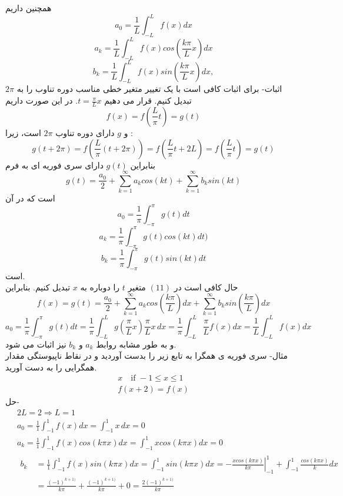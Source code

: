 همچنین داریم
\[
a_0=\frac{1}{L}\int_{-L}^L{f(x)dx}
\]
\[
a_k=\frac{1}{L}\int_{-L}^L{f(x)cos\left(\frac{k\pi}{L}x\right)dx}
\]
\[
b_k=\frac{1}{L}\int_{-L}^L{f(x)sin\left(\frac{k\pi}{L}x\right)dx},
\]
اثبات- برای اثبات کافی است با یک تغییر متغیر خطی مناسب دوره تناوب را به
$2\pi$
تبدیل کنیم. قرار می دهیم
$t=\frac{\pi}{L}x$.
در این صورت داریم
\[
f(x)=f(\frac{L}{\pi}t)=g(t)
\]
و 
$g$
دارای دوره تناوب 
$2\pi$
است، زیرا :
\[
g(t+2\pi)=f\left(\frac{L}{\pi}\left(t+2\pi\right)\right)=f\left(\frac{L}{\pi}t+2L\right)=f\left(\frac{L}{\pi}t\right)=g(t)
\]
بنابراین
$g(t)$
دارای سری فوریه ای به فرم
\begin{equation}
	g(t)=\frac{a_0}{2}+\sum_{k=1}^\infty{a_kcos(kt)}+\sum_{k=1}^\infty{b_ksin(kt)}
\end{equation}
است که در آن
\[
a_0=\frac{1}{\pi}\int_{-\pi}^\pi{g(t)dt}
\]
\[
a_k=\frac{1}{\pi}\int_{-\pi}^\pi{g(t)cos(kt)dt)}
\]
\[
b_k=\frac{1}{\pi}\int_{-\pi}^\pi{g(t)sin(kt)dt}
\]
است.\\
حال کافی است در
$(11)$
متغیر
$t$
را دوباره به 
$x$
تبدیل کنیم. بنابراین
\[
f(x)=g(t)=\frac{a_0}{2}+\sum_{k=1}^\infty{a_kcos\left(\frac{k\pi}{L}\right)dx}+\sum_{k=1}^\infty{b_ksin\left(\frac{k\pi}{L}\right)dx}
\]
\[
a_0=\frac{1}{\pi}\int_{-\pi}^\pi{g(t)dt}=
\frac{1}{\pi}\int_{-L}^L{g\left(\frac{\pi}{L}x\right)\frac{\pi}{L}x \, dx}=\frac{1}{\pi}\int_{-L}^L{\frac{\pi}{L}f(x)dx}=
\frac{1}{L}\int_{-L}^L{f(x)dx}
\]
و به طور مشابه روابط
$a_k$
و
$b_k$
نیز اثبات می شود.\\
مثال- سری فوریه ی همگرا به تابع زیر را بدست آوردید و در نقاط ناپیوستگی مقدار همگرایی را به دست آورید.
\begin{equation*}
	\begin{gathered}
		x \quad \text{if } -1\le x\le 1
		\\
		f(x+2)=f(x)
	\end{gathered}
\end{equation*}
حل-
\begin{equation*}
	\begin{aligned}
		{} &\
		2L=2\Rightarrow L=1
		\\ &\
		a_0=\frac{1}{1}\int_{-1}^1{f(x)dx}=\int_{-1}^1{x \, dx}=0
		\\ &\
		a_k=\frac{1}{1}\int_{-1}^1{f(x)cos(k\pi x)dx}=\int_{-1}^1{xcos(k\pi x)dx}=0 
		\\ &\ \begin{aligned}
			b_k {} &\
			=\frac{1}{1}\int_{-1}^1{f(x)sin(k\pi x)dx}=\int_{-1}^1{sin(k\pi x)dx}=\left. {-\frac{xcos(k\pi x)}{k\pi}}\right |_{-1}^1+\int_{-1}^1{\frac{cos(k\pi x)}{k}dx}
			\\ &\ 
			= \frac{(-1)^{k+1)}}{k\pi}+\frac{(-1)^{k+1)}}{k\pi}+0=\frac{2(-1)^{k+1)}}{k\pi}
		\end{aligned}
	\end{aligned}
\end{equation*}
